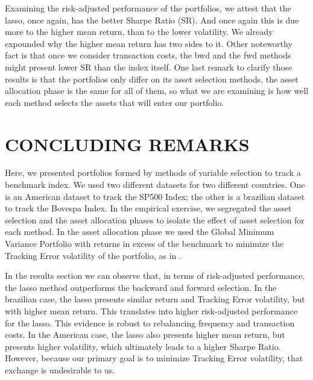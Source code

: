 \documentclass[12pt,oneside,a4paper]{memoir}
\begin{document}
Examining the risk-adjusted performance of the portfolios, we attest that the lasso, once again, has the better Sharpe Ratio (SR).
And once again this is due more to the higher mean return, than to the lower volatility.
We already expounded why the higher mean return has two sides to it.
Other noteworthy fact is that once we consider transaction costs, the bwd and the fwd methods might present lower SR than the index itself.
One last remark to clarify those results is that the portfolios only differ on its asset selection methods, the asset allocation phase is the same for all of them, so what we are examining is how well each method selects the assets that will enter our portfolio.
\section{CONCLUDING REMARKS} \label{sec:conc}

Here, we presented portfolios formed by methods of variable selection to track a benchmark index.
We used two different datasets for two different countries.
One is an American dataset to track the SP500 Index; the other is a brazilian dataset to track the Bovespa Index.
In the empirical exercise, we segregated the asset selection and the asset allocation phases to isolate the effect of asset selection for each method.
In the asset allocation phase we used the Global Minimum Variance Portfolio with returns in excess of the benchmark to minimize the Tracking Error volatility of the portfolio, as in .

In the results section we can observe that, in terms of risk-adjusted performance, the lasso method outperforms the backward and forward selection. 
In the brazilian case, the lasso presents similar return and Tracking Error volatility, but with higher mean return.
This translates into higher risk-adjusted performance for the lasso.
This evidence is robust to rebalancing frequency and transaction costs.
In the American case, the lasso also presents higher mean return, but presents higher volatility, which ultimately leads to a higher Sharpe Ratio.
However, because our primary goal is to minimize Tracking Error volatility, that exchange is undesirable to us.
\end{document}
